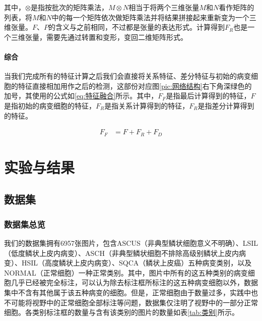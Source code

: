 \par 其中，$\otimes$是指按批次的矩阵乘法，$M\otimes N$相当于将两个三维张量$M$和$N$看作矩阵的列表，将$M$和$N$中的每一个矩阵依次做矩阵乘法并将结果拼接起来重新变为一个三维张量。$F$、$P$的含义与之前相同，不过都是张量的表达形式。计算得到$F_R$也是一个三维张量，需要先通过转置和变形，变回二维矩阵形式。

\paragraph{综合}
\par 当我们完成所有的特征计算之后我们会直接将关系特征、差分特征与初始的病变细胞的特征直接相加用作之后的检测，这部份对应图\ref{pic:网络结构}右下角深绿色的加号，其使用的公式如\ref{eq:特征融合}所示。其中，$F_F$是指最后计算得到的特征，$F$是指初始的病变细胞的特征，$F_R$是指关系计算得到的特征，$F_R$是指差分计算得到的特征。

\begin{equation}
    \begin{aligned}
        F_F & =F+F_R+F_D
    \end{aligned}
    \label{eq:特征融合}
\end{equation}

\clearpage

\section{实验与结果}

\subsection{数据集}
\subsubsection{数据集总览}
\par 我们的数据集拥有6957张图片，包含ASCUS（非典型鳞状细胞意义不明确）、LSIL（低度鳞状上皮内病变）、ASCH（非典型鳞状细胞不排除高级别鳞状上皮内病变）、HSIL（高度鳞状上皮内病变）、SQCA（鳞状上皮癌）五种病变类别，以及NORMAL（正常细胞）一种正常类别。其中，图片中所有的这五种类别的病变细胞几乎已经被完全标注，可以认为除去标注框所标注的这五种病变细胞以外，数据集中不含有其他属于该五种病变的细胞。但是，正常细胞由于数量过多，实践中也不可能将视野中的正常细胞全部标注等问题，数据集仅注明了视野中的一部分正常细胞。各类别标注框的数量与含有该类别的图片的数量如表\ref{tab:类别}所示。

